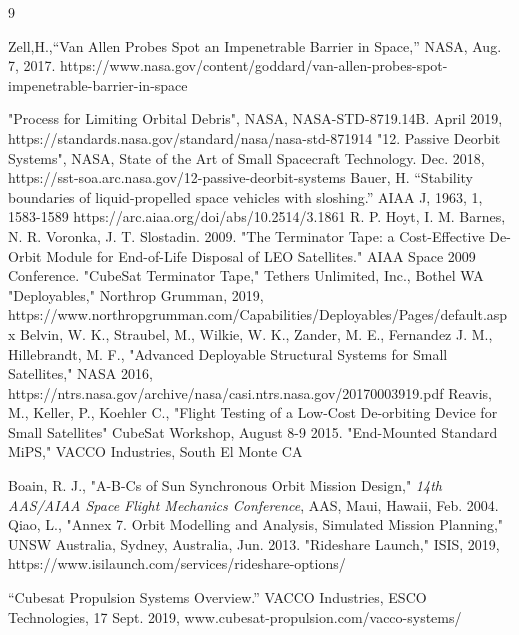 \documentclass[3p]{elsarticle}
\begin{document}
\begin{thebibliography}{9}%

 Zell,H.,“Van Allen Probes Spot an Impenetrable Barrier in Space,” NASA, Aug. 7, 2017. https://www.nasa.gov/content/goddard/van-allen-probes-spot-impenetrable-barrier-in-space



"Process for Limiting Orbital Debris", NASA, NASA-STD-8719.14B. April 2019, https://standards.nasa.gov/standard/nasa/nasa-std-871914
 "12. Passive Deorbit Systems", NASA, State of the Art of Small Spacecraft Technology. Dec. 2018, https://sst-soa.arc.nasa.gov/12-passive-deorbit-systems 
 Bauer, H. “Stability boundaries of liquid-propelled space vehicles with sloshing.” AIAA J, 1963, 1, 1583-1589 https://arc.aiaa.org/doi/abs/10.2514/3.1861
 R. P. Hoyt, I. M. Barnes, N. R. Voronka, J. T. Slostadin. 2009. "The Terminator Tape: a Cost-Effective De-Orbit Module for End-of-Life Disposal of LEO Satellites." AIAA Space 2009 Conference.
 "CubeSat Terminator Tape," Tethers Unlimited, Inc., Bothel WA
 "Deployables," Northrop Grumman, 2019, https://www.northropgrumman.com/Capabilities/Deployables/Pages/default.aspx
 Belvin, W. K., Straubel, M., Wilkie, W. K., Zander, M. E., Fernandez J. M., Hillebrandt, M. F., "Advanced Deployable Structural Systems for Small Satellites," NASA 2016, https://ntrs.nasa.gov/archive/nasa/casi.ntrs.nasa.gov/20170003919.pdf
 Reavis, M., Keller, P., Koehler C., "Flight Testing of a Low-Cost De-orbiting Device for Small Satellites" CubeSat Workshop, August 8-9 2015.
 "End-Mounted Standard MiPS," VACCO Industries, South El Monte CA

 Boain, R. J., "A-B-Cs of Sun Synchronous Orbit Mission Design," \textit{14th AAS/AIAA Space Flight Mechanics Conference}, AAS, Maui, Hawaii, Feb. 2004. 
 Qiao, L., "Annex 7. Orbit Modelling and Analysis, Simulated Mission Planning," UNSW Australia, Sydney, Australia, Jun. 2013. 
 "Rideshare Launch," ISIS, 2019, https://www.isilaunch.com/services/rideshare-options/

 “Cubesat Propulsion Systems Overview.” VACCO Industries, ESCO Technologies, 17 Sept. 2019, www.cubesat-propulsion.com/vacco-systems/

\end{thebibliography}
\end{document}
